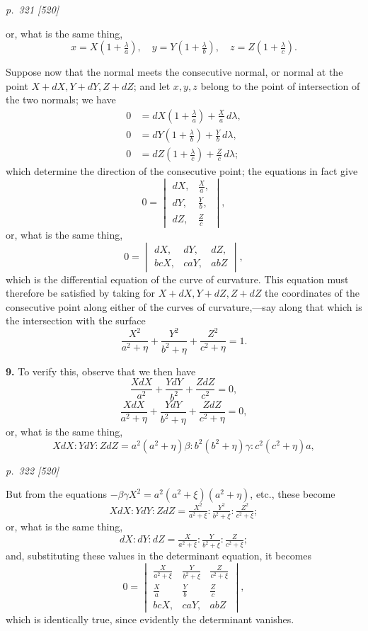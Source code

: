 \documentclass[11pt,a4paper]{book}
\begin{document}
\clearpage

\bigskip
\textit{p.~321 [520]}
\smallskip

or, what is the same thing,
\[
x = X\left(1 + \tfrac{\lambda}{a}\right),\quad y = Y\left(1 + \tfrac{\lambda}{b}\right),\quad z = Z\left(1 + \tfrac{\lambda}{c}\right).
\]

Suppose now that the normal meets the consecutive normal, or normal at the point $X + dX, Y + dY, Z + dZ$; and let $x, y, z$ belong to the point of intersection of the two normals; we have
\begin{align*}
0 &= dX\left(1 + \tfrac{\lambda}{a}\right) + \tfrac{X}{a}\,d\lambda,\\
0 &= dY\left(1 + \tfrac{\lambda}{b}\right) + \tfrac{Y}{b}\,d\lambda,\\
0 &= dZ\left(1 + \tfrac{\lambda}{c}\right) + \tfrac{Z}{c}\,d\lambda;
\end{align*}
which determine the direction of the consecutive point; the equations in fact give
\[
0 = \begin{vmatrix} dX, & \tfrac{X}{a},\\ dY, & \tfrac{Y}{b},\\ dZ, & \tfrac{Z}{c} \end{vmatrix},
\]
or, what is the same thing,
\[
0 = \begin{vmatrix} dX, & dY, & dZ,\\ b cX, & caY, & abZ \end{vmatrix},
\]
which is the differential equation of the curve of curvature. This equation must therefore be satisfied by taking for $X + dX, Y + dZ, Z + dZ$ the coordinates of the consecutive point along either of the curves of curvature,---say along that which is the intersection with the surface
\[
\frac{X^2}{a^2 + \eta} + \frac{Y^2}{b^2 + \eta} + \frac{Z^2}{c^2 + \eta} = 1.
\]

\textbf{9.} To verify this, observe that we then have
\[
\frac{X dX}{a^2} + \frac{Y dY}{b^2} + \frac{Z dZ}{c^2} = 0,
\]
\[
\frac{X dX}{a^2 + \eta} + \frac{Y dY}{b^2 + \eta} + \frac{Z dZ}{c^2 + \eta} = 0,
\]
or, what is the same thing,
\[
X dX : Y dY : Z dZ = a^2(a^2 + \eta)\beta : b^2(b^2 + \eta)\gamma : c^2(c^2 + \eta)a,
\]

\clearpage

\bigskip
\textit{p.~322 [520]}
\smallskip

But from the equations $-\beta\gamma X^2 = a^2(a^2 + \xi)(a^2 + \eta)$, etc., these become
\[
X dX : Y dY : Z dZ = \tfrac{X^2}{a^2 + \xi} : \tfrac{Y^2}{b^2 + \xi} : \tfrac{Z^2}{c^2 + \xi};
\]
or, what is the same thing,
\[
dX : dY : dZ = \tfrac{X}{a^2 + \xi} : \tfrac{Y}{b^2 + \xi} : \tfrac{Z}{c^2 + \xi};
\]
and, substituting these values in the determinant equation, it becomes
\[
0 = \begin{vmatrix} \tfrac{X}{a^2 + \xi} & \tfrac{Y}{b^2 + \xi} & \tfrac{Z}{c^2 + \xi}\\
\tfrac{X}{a} & \tfrac{Y}{b} & \tfrac{Z}{c}\\
b cX, & caY, & abZ \end{vmatrix},
\]
which is identically true, since evidently the determinant vanishes.
\end{document}
